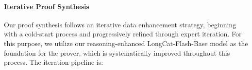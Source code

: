 \noindent\paragraph{Iterative Proof Synthesis}
Our proof synthesis follows an iterative data enhancement strategy, beginning with a cold-start process and progressively refined through expert iteration.
For this purpose, we utilize our reasoning-enhanced LongCat-Flash-Base model as the foundation for the prover, which is systematically improved throughout this process.
The iteration pipeline is: 
